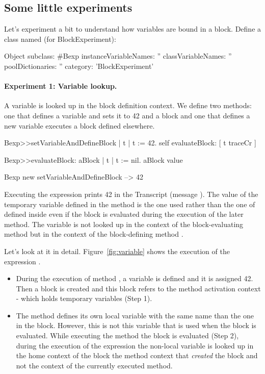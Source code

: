 \documentclass[a4paper,10pt,twoside]{book}
\begin{document}
\subsection{Some little experiments}
Let's experiment a bit to understand how variables are bound in a block. Define a class named  (for BlockExperiment):

\begin{code}{}
Object subclass: #Bexp
	instanceVariableNames: ''
	classVariableNames: ''
	poolDictionaries: ''
	category: 'BlockExperiment'
\end{code}


\paragraph{Experiment 1: Variable lookup.} A variable is looked up in the block definition context. We define two methods: one that defines a variable  and sets it to 42 and a block and one that defines a new variable executes a block defined elsewhere.



\begin{code}{}
Bexp>>setVariableAndDefineBlock
	| t |
	t := 42.
	self evaluateBlock: [ t traceCr ]
	
Bexp>>evaluateBlock: aBlock
	| t |
	t := nil.
	aBlock value	

Bexp new setVariableAndDefineBlock 
--> 42
\end{code}


Executing the  expression prints 42 in the Transcript (message ). The value of the temporary variable  defined in the  method is the one used rather than the one of  defined inside  even if the block is evaluated during the execution of the later method. The variable  is not looked up in the context of the  block-evaluating method  but in the context of the block-defining method .

Let's look at it in detail. Figure~\ref{fig:variable} shows the execution of the expression . 

\begin{itemize}
\item During the execution of method , a variable  is defined and it is assigned 42. Then a block is created and this block refers to the method activation context - which holds temporary variables (Step 1). 

\item The method  defines its own local variable  with the same name than the one in the block. However, this is not this variable that is used when the block is evaluated. While executing the method  the block is evaluated (Step 2), during the execution of the expression  the non-local variable  is looked up in the home context of the block \ie the method context that \emph{created} the block and not the context of the currently executed method.
\end{itemize}
\end{document}
